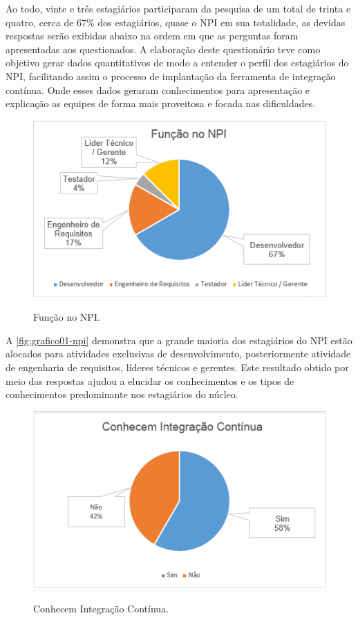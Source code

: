 Ao todo, vinte e três estagiários participaram da pesquisa de um total de trinta e quatro, cerca de 67\% dos estagiários, quase o NPI em sua totalidade, as devidas respostas serão exibidas abaixo na ordem em que as perguntas foram apresentadas aos questionados. A elaboração deste questionário teve como objetivo gerar dados quantitativos de modo a entender o perfil dos estagiários do NPI, facilitando assim o processo de implantação da ferramenta de integração contínua. Onde esses dados geraram conhecimentos para apresentação e explicação as equipes de forma mais proveitosa e focada nas dificuldades.


\begin{figure}[H]
\centering
\caption[Função NPI]{Função no NPI.}\includegraphics[scale=0.9]{./images/grafico-ci01}
\label{fig:grafico01-npi}
\end{figure}

A \autoref{fig:grafico01-npi} demonstra que a grande maioria dos estagiários do NPI estão alocados para atividades exclusivas de desenvolvimento, posteriormente atividade de engenharia de requisitos, líderes técnicos e gerentes. Este resultado obtido por meio das respostas ajudou a elucidar os conhecimentos e os tipos de conhecimentos predominante nos estagiários do núcleo.

\begin{figure}[H]
\centering
\caption[Conhecem Integração Contínua]{Conhecem Integração Contínua.}\includegraphics[scale=0.9]{./images/grafico-ci02}
\label{fig:grafico02-npi}
\end{figure}

